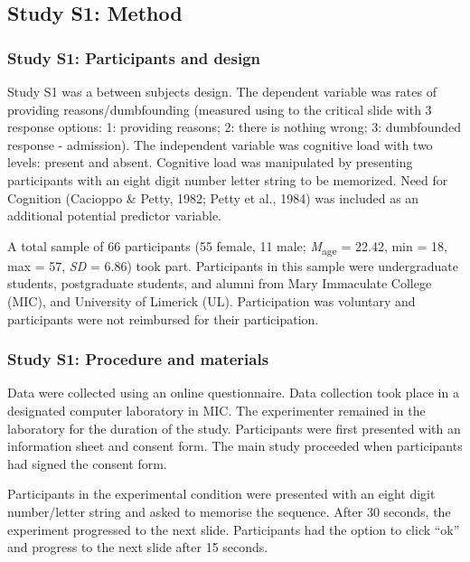 \documentclass[
  man,floatsintext]{apa6}
\begin{document}
\hypertarget{study-s1-method}{%
\subsection{Study S1: Method}\label{study-s1-method}}

\hypertarget{study-s1-participants-and-design}{%
\subsubsection{Study S1: Participants and design}\label{study-s1-participants-and-design}}

Study S1 was a between subjects design. The dependent variable was rates of providing reasons/dumbfounding (measured using to the critical slide with 3 response options: 1: providing reasons; 2: there is nothing wrong; 3: dumbfounded response - admission). The independent variable was cognitive load with two levels: present and absent. Cognitive load was manipulated by presenting participants with an eight digit number letter string to be memorized. Need for Cognition (Cacioppo \& Petty, 1982; Petty et al., 1984) was included as an additional potential predictor variable.

A total sample of 66 participants (55 female, 11 male; \emph{M}\textsubscript{age} = 22.42, min = 18, max = 57, \emph{SD} = 6.86) took part. Participants in this sample were undergraduate students, postgraduate students, and alumni from Mary Immaculate College (MIC), and University of Limerick (UL). Participation was voluntary and participants were not reimbursed for their participation.

\hypertarget{study-s1-procedure-and-materials}{%
\subsubsection{Study S1: Procedure and materials}\label{study-s1-procedure-and-materials}}

Data were collected using an online questionnaire. Data collection took place in a designated computer laboratory in MIC. The experimenter remained in the laboratory for the duration of the study. Participants were first presented with an information sheet and consent form. The main study proceeded when participants had signed the consent form.

Participants in the experimental condition were presented with an eight digit number/letter string and asked to memorise the sequence. After 30 seconds, the experiment progressed to the next slide. Participants had the option to click ``ok'' and progress to the next slide after 15 seconds.
\end{document}
